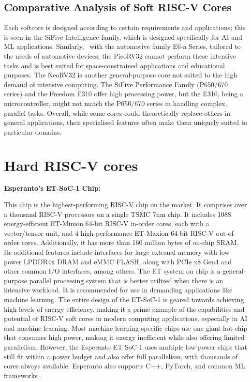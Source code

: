 \documentclass[conference]{IEEEtran}
\begin{document}
\subsection{Comparative Analysis of Soft RISC-V Cores}
Each softcore is designed according to certain requirements and applications; this is seen in the SiFive Intelligence family, which is designed specifically for AI and ML applications. Similarly,  with the automotive family E6-a Series, tailored to the needs of automotive devices, the PicoRV32 cannot perform these intensive tasks and is best suited for space-constrained applications and educational purposes. The NeoRV32 is another general-purpose core not suited to the high demand of intensive computing. The SiFive Performance Family (P650/670 series) and the Freedom E310 offer high processing power, but the E310, being a microcontroller, might not match the P650/670 series in handling complex, parallel tasks. Overall, while some cores could theoretically replace others in general applications, their specialised features often make them uniquely suited to particular domains. 

\section{Hard RISC-V cores}
\textbf{Esperanto’s ET-SoC-1 Chip:} 

This chip is the highest-performing RISC-V chip on the market. It comprises over a thousand RISC-V processors on a single TSMC 7nm chip. It includes 1088 energy-efficient ET-Minion 64-bit RISC-V in-order cores, each with a vector/tensor unit, and 4 high-performance ET-Maxion 64-bit RISC-V out-of-order cores. Additionally, it has more than 160 million bytes of on-chip SRAM. Its additional features include interfaces for large external memory with low-power LPDDR4x DRAM and eMMC FLASH, along with PCIe x8 Gen4 and other common I/O interfaces, among others. The ET system on chip is a general-purpose parallel processing system that is better utilized when there is an intensive workload. It is recommended for use in demanding applications like machine learning. The entire design of the ET-SoC-1 is geared towards achieving high levels of energy efficiency, making it a prime example of the capabilities and potential of RISC-V soft cores in modern computing applications, especially in AI and machine learning. Most machine learning-specific chips use one giant hot chip that consumes high power, making it energy inefficient while also offering limited parallelism. However, the Esperanto ET SoC-1 uses multiple low-power chips that still fit within a power budget and also offer full parallelism, with thousands of cores always available. Esperanto also supports C++, PyTorch, and common ML frameworks \cite{7}. 
\end{document}
